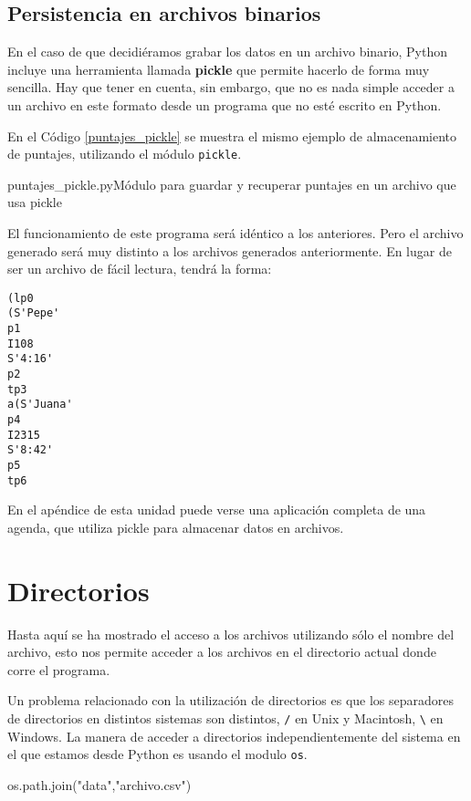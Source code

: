 \subsection{Persistencia en archivos binarios}

En el caso de que decidiéramos grabar los datos en un archivo binario,
Python incluye una herramienta llamada \textbf{pickle} que permite hacerlo
de forma muy sencilla.  Hay que tener en cuenta, sin embargo, que no es
nada simple acceder a un archivo en este formato desde un programa que no
esté escrito en Python.

En el Código \ref{puntajes_pickle} se muestra el mismo ejemplo de
almacenamiento de puntajes, utilizando el módulo \lstinline!pickle!.

\begin{codigo}{puntajes\_pickle.py}{Módulo para guardar y recuperar puntajes en un archivo que usa pickle}
\label{puntajes_pickle}

\end{codigo}

El funcionamiento de este programa será idéntico a los anteriores.  Pero el
archivo generado será muy distinto a los archivos generados anteriormente.
En lugar de ser un archivo de fácil lectura, tendrá la forma:

\begin{verbatim}
(lp0
(S'Pepe'
p1
I108
S'4:16'
p2
tp3
a(S'Juana'
p4
I2315
S'8:42'
p5
tp6
\end{verbatim}

En el apéndice de esta unidad puede verse una aplicación completa de una
agenda, que utiliza pickle para almacenar datos en archivos.

\section{Directorios}

Hasta aquí se ha mostrado el acceso a los archivos utilizando sólo el
nombre del archivo, esto nos permite acceder a los archivos en el
directorio actual donde corre el programa.

Un problema relacionado con la utilización de directorios es que los
separadores de directorios en distintos sistemas son distintos, \verb!/! en
Unix y Macintosh, \verb!\! en Windows. La manera de acceder a directorios
independientemente del sistema en el que estamos desde Python es usando el
modulo \lstinline!os!.

\begin{codigo-python-sn}
os.path.join("data","archivo.csv")
\end{codigo-python-sn}

